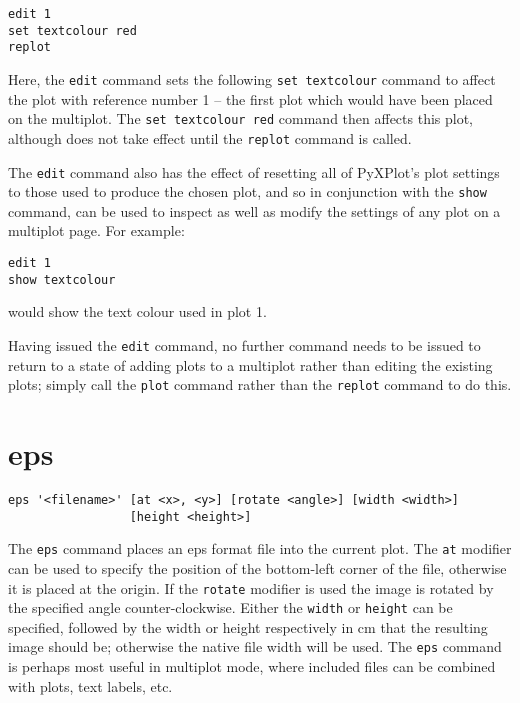 \documentclass[a4paper,onecolumn,11pt]{book}
\begin{document}
\begin{verbatim}
edit 1
set textcolour red
replot
\end{verbatim}

Here, the {\tt edit} command sets the following {\tt set textcolour} command to
affect the plot with reference number 1 -- the first plot which would have been
placed on the multiplot. The {\tt set textcolour red} command then affects this
plot, although does not take effect until the {\tt replot} command is called.

The {\tt edit} command also has the effect of resetting all of PyXPlot's plot
settings to those used to produce the chosen plot, and so in conjunction with
the {\tt show} command, can be used to inspect as well as modify the settings of
any plot on a multiplot page. For example:

\begin{verbatim}
edit 1
show textcolour
\end{verbatim}

\noindent would show the text colour used in plot 1.

Having issued the {\tt edit} command, no further command needs to be issued to
return to a state of adding plots to a multiplot rather than editing the
existing plots; simply call the {\tt plot} command rather than the {\tt replot}
command to do this.


\section{eps}

\begin{verbatim}
eps '<filename>' [at <x>, <y>] [rotate <angle>] [width <width>]
                 [height <height>]
\end{verbatim}

The {\tt eps} command places an eps format file into the current plot.  The
{\tt at} modifier can be used to specify the position of the bottom-left corner
of the file, otherwise it is placed at the origin.  If the {\tt rotate} modifier
is used the image is rotated by the specified angle counter-clockwise.  Either
the {\tt width} or {\tt height} can be specified, followed by the width or
height respectively in cm that the resulting image should be; otherwise the
native file width will be used.  The {\tt eps} command is perhaps most useful in
multiplot mode, where included files can be combined with plots, text labels,
etc.
\end{document}
